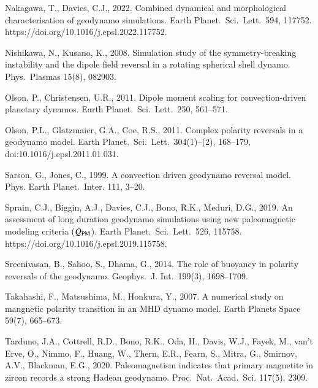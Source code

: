 \begin{list}
{}
%
\item
\sloppy
Nakagawa, T., Davies, C.J., 2022. Combined dynamical and morphological characterisation of geodynamo simulations. Earth Planet.\ Sci.\ Lett.\ 594, 117752. https://doi.org/10.1016/j.epsl.2022.117752. 
%
\item
Nishikawa, N., Kusano, K., 2008. Simulation study of the symmetry-breaking instability and the dipole field reversal in a rotating spherical shell dynamo. Phys.\ Plasmas 15(8), 082903.
%
%
\item 
Olson, P., Christensen, U.R., 2011. Dipole moment scaling for convection-driven planetary dynamos. Earth Planet.\ Sci.\ Lett.\ 250, 561--571.
%
\item
\sloppy
Olson, P.L., Glatzmaier, G.A., Coe, R.S., 2011. Complex polarity reversals in a geodynamo model. Earth Planet.\ Sci.\ Lett.\ 304(1)--(2), 168--179, doi:10.1016/j.epsl.2011.01.031.
%
\item
Sarson, G., Jones, C., 1999. A convection driven geodynamo reversal model. Phys. Earth Planet.\ Inter. 111, 3--20.
%
%
\item 
{\color{teal}
Sprain, C.J., Biggin, A.J., Davies, C.J., Bono, R.K., Meduri, D.G., 2019. An assessment of long duration geodynamo simulations using new paleomagnetic modeling criteria ($Q_{\rm PM}$). Earth Planet.\ Sci.\ Lett.\ 526, 115758. https://doi.org/10.1016/j.epsl.2019.115758.
}
%
\item
Sreenivasan, B., Sahoo, S., Dhama, G., 2014. The role of buoyancy in polarity reversals of the geodynamo. Geophys.\ J. Int.\ 199(3), 1698--1709.
%
\item
Takahashi, F., Matsushima, M., Honkura, Y., 2007. A numerical study on mangnetic polarity transition in an MHD dynamo model. Earth Planets Space 59(7), 665--673.
%
\item
Tarduno, J.A., Cottrell, R.D., Bono, R.K., Oda, H., Davis, W.J., Fayek, M., van't Erve, O., Nimmo, F., Huang, W., Thern, E.R., Fearn, S., Mitra, G., Smirnov, A.V., Blackman, E.G., 2020. Paleomagnetism indicates that primary magnetite in zircon records a strong Hadean geodynamo. Proc.\ Nat.\ Acad.\ Sci. 117(5), 2309.

\end{list}
